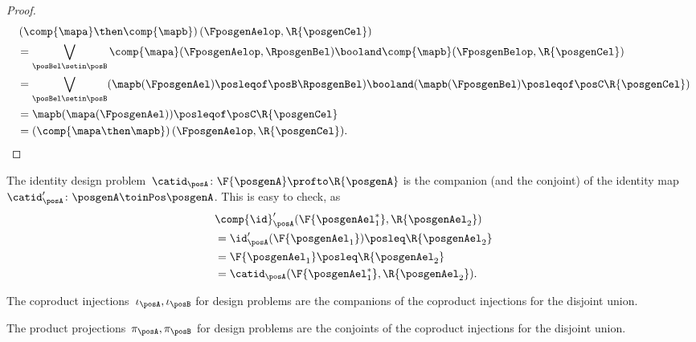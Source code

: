 \begin{proof}
    \begin{equation}
        \begin{aligned}
            ~ & \left(\comp{\mapa}\then \comp{\mapb}\right)(\FposgenAelop,\R{\posgenCel}) \\
              & =\bigvee_{\posBel\setin \posB} \comp{\mapa}(\FposgenAelop,\RposgenBel)\booland\comp{\mapb}(\FposgenBelop,\R{\posgenCel}) \\%
              & =\bigvee_{\posBel\setin \posB} (\mapb(\FposgenAel)\posleqof\posB \RposgenBel)\booland (\mapb(\FposgenBel)\posleqof\posC \R{\posgenCel}) \\
              & =\mapb(\mapa(\FposgenAel))\posleqof\posC \R{\posgenCel} \\
              & =\left(\comp{\mapa\then \mapb}\right)(\FposgenAelop,\R{\posgenCel}).
        \end{aligned}
    \end{equation}
\end{proof}

\begin{example}
    The identity design problem~$\catid_\posA\colon \F{\posgenA} \profto \R{\posgenA}$ is the companion (and the conjoint) of the identity map~$\catid_\posA'\colon \posgenA \toinPos \posgenA$.
    This is easy to check, as
    \begin{equation}
        \begin{aligned}
            ~ & \comp{\id}_\posA'(\F{\posgenAel_1^*},\R{\posgenAel_2}) \\
              & =\id_\posA'(\F{\posgenAel_1})\posleq \R{\posgenAel_2} \\
              & =\F{\posgenAel_1}\posleq \R{\posgenAel_2} \\
              & =\catid_\posA(\F{\posgenAel_1^*},\R{\posgenAel_2}).
        \end{aligned}
    \end{equation}
\end{example}

\begin{example}
    The coproduct injections~$\iota_\posA, \iota_\posB$ for design problems are the companions of the coproduct injections for the disjoint union.
\end{example}

\begin{example}
    The product projections~$\pi_\posA, \pi_\posB$ for design problems are the conjoints of the coproduct injections for the disjoint union.
\end{example}

